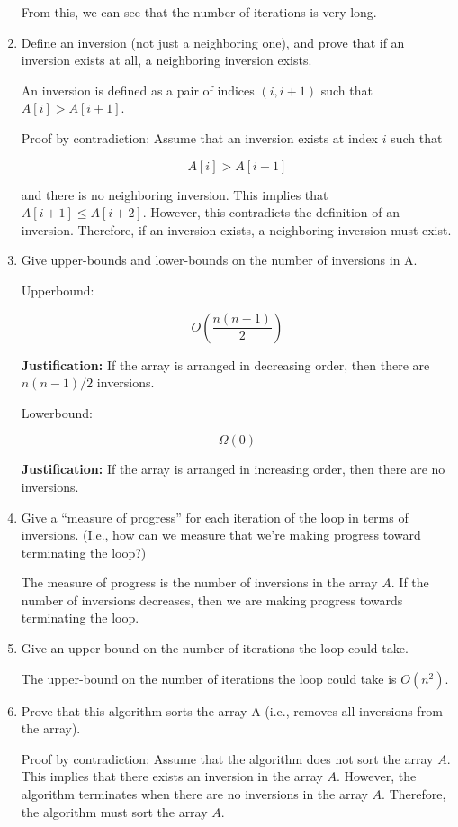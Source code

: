 \documentclass[12pt]{article}
\begin{document}
\begin{enumerate}
        From this, we can see that the number of iterations is very long.

    \item Define an inversion (not just a neighboring one), and prove that if an inversion exists at all,
        a neighboring inversion exists. 
        
        An inversion is defined as a pair of indices $(i, i + 1)$ such that 
        $A[i] > A[i + 1]$.
        
        Proof by contradiction: Assume that an inversion exists at index $i$ such that

        \[
            A[i] > A[i + 1]
        \]

        and there is no neighboring inversion. This implies that $A[i + 1] \leq A[i + 2]$.
        However, this contradicts the definition of an inversion. Therefore, if an inversion exists,
        a neighboring inversion must exist.

    \item Give upper-bounds and lower-bounds on the number of inversions in A.
    
        Upperbound:

        \[ O(\frac{n(n-1)}{2}) \]

        \textbf{Justification:} If the array is arranged in decreasing order, 
        then there are $n(n-1)/2$ inversions.

        Lowerbound:

        \[ \Omega(0) \]

        \textbf{Justification:} If the array is arranged in increasing order, then there are no inversions.
    
    \item Give a “measure of progress” for each iteration of the loop in terms of inversions. (I.e., how can we
    measure that we’re making progress toward terminating the loop?)

        The measure of progress is the number of inversions in the array $A$. If the number of inversions
        decreases, then we are making progress towards terminating the loop.

    \item Give an upper-bound on the number of iterations the loop could take.
    
        The upper-bound on the number of iterations the loop could take is $O(n^2)$.
    
    \item Prove that this algorithm sorts the array A (i.e., removes all inversions from the array).
    
        Proof by contradiction: Assume that the algorithm does not sort the array $A$. This implies that
        there exists an inversion in the array $A$. However, the algorithm terminates when there are no
        inversions in the array $A$. Therefore, the algorithm must sort the array $A$.

    

\end{enumerate}
\end{document}
